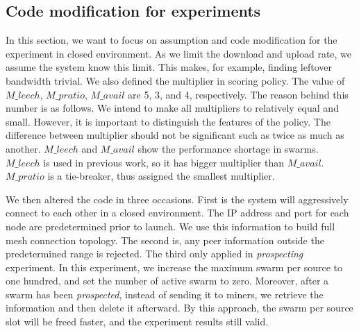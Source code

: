 %

\subsection{Code modification for experiments}
\label{section:predlsetup}
In this section, we want to focus on assumption and code modification for the experiment in closed environment. As we limit the download and upload rate, we assume the system know this limit. This makes, for example, finding leftover bandwidth trivial. We also defined the multiplier in scoring policy. The value of $M\_leech$, $M\_pratio$, $M\_avail$ are 5, 3, and 4, respectively. The reason behind this number is as follows. We intend to make all multipliers to relatively equal and small. However, it is important to distinguish the features of the policy. The difference between multiplier should not be significant such as twice as much as another. $M\_leech$ and $M\_avail$ show the performance shortage in swarms. $M\_leech$ is used in previous work, so it has bigger multiplier than $M\_avail$. $M\_pratio$ is a tie-breaker, thus assigned the smallest multiplier.

We then altered the code in three occasions. First is the system will aggressively connect to each other in a closed environment. The IP address and port for each node are predetermined prior to launch. We use this information to build full mesh connection topology. The second is, any peer information outside the predetermined range is rejected. The third only applied in \textit{prospecting} experiment. In this experiment, we increase the maximum swarm per source to one hundred, and set the number of active swarm to zero. Moreover, after a swarm has been \textit{prospected}, instead of sending it to miners, we retrieve the information and then delete it afterward. By this approach, the swarm per source slot will be freed faster, and the experiment results still valid. 

